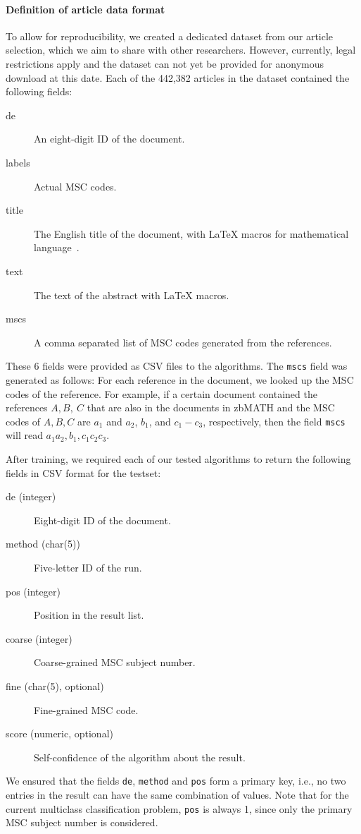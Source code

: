 \paragraph{Definition of article data format}
To allow for reproducibility, we created a dedicated dataset from our article selection, which we aim to share with other researchers.
However, currently, legal restrictions apply and the dataset can not yet be provided for anonymous download at this date.
Each of the 442,382 articles in the dataset contained the following fields:
\begin{description}
  \item[de] An eight-digit ID of the document\footnotemark.
  \item[labels] Actual MSC codes\footnotemark[\value{footnote}].
  \item[title] The English title of the document, with LaTeX macros for mathematical language~\cite{Schubotz2019b}.
  \item[text] The text of the abstract with LaTeX macros.
  \item[mscs] A comma separated list of MSC codes generated from the references.
\end{description}
These 6 fields were provided as CSV files to the algorithms. The \texttt{mscs} field was generated as follows: For each reference in the document, we looked up the MSC codes of the reference. For example, if a certain document contained the references \(A,B,\ C\) that are also in the documents in zbMATH and the MSC codes of \(A,B,C\) are \(a_{1}\) and \(a_{2}\), \(b_{1}\), and \(c_{1} - c_{3}\), respectively, then the field \texttt{mscs} will read \(a_{1}a_{2},b_{1},c_{1}c_{2}c_{3}.\)

After training, we required each of our tested algorithms to return the following fields in CSV format for the testset:
\begin{description}
  \item[de (integer)] Eight-digit ID of the document.
  \item[method (char(5))] Five-letter ID of the run.
  \item[pos (integer)] Position in the result list.
  \item[coarse (integer)] Coarse-grained MSC subject number.
  \item[fine (char(5), optional)] Fine-grained MSC code.
  \item[score (numeric, optional)] Self-confidence of the algorithm about the result.
\end{description}
We ensured that the fields \texttt{de}, \texttt{method} and \texttt{pos} form a primary key, i.e., no two entries in the result can have the same combination of values.
Note that for the current multiclass classification problem, \texttt{pos} is always 1, since only the primary MSC subject number is considered.
